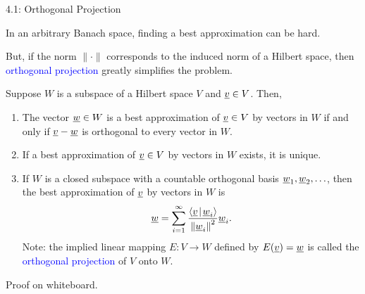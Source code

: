 \documentclass[10pt,letterpaper,english]{beamer}
\begin{document}
\begin{frame}{4.1: Orthogonal Projection}

In an arbitrary Banach space, finding a best approximation can be hard.

\vspace{2mm}

But, if the norm $\| \cdot \|$ corresponds to the induced norm of a Hilbert space, then \textcolor{blue}{orthogonal projection} greatly simplifies the problem.

\begin{theorem} Suppose $W$ is a subspace of a Hilbert space $V$ and $\underline{v} \in V$.
Then,
\begin{enumerate}
\item The vector $\underline{w} \in W$ is a best approximation of $\underline{v} \in V$ by vectors in $W$ if and only if $\underline{v} - \underline{w}$ is orthogonal to every vector in $W$.
\item If a best approximation of $\underline{v} \in V$ by vectors in $W$ exists, it is unique.
\item If $W$ is a closed subspace with a countable orthogonal basis $\underline{w}_1, \underline{w}_2, \ldots$, then the best approximation of $\underline{v}$ by vectors in $W$ is \vspace{-1.5mm}
\begin{equation*}
\vecnot{w} = \sum_{i=1}^\infty \frac{ \inner{ \vecnot{v} }{ \vecnot{w}_i } }{ \left\| \vecnot{w}_i \right\|^2 } \vecnot{w}_i . \vspace{-1mm}
\end{equation*}
Note: the implied linear mapping $E\colon V \to W$ defined by $E(\underline{v}) = \underline{w}$ is called the \textcolor{blue}{orthogonal projection} of $V$ onto $W$.
\end{enumerate}
\end{theorem}

Proof on whiteboard.

\end{frame}

\end{document}

